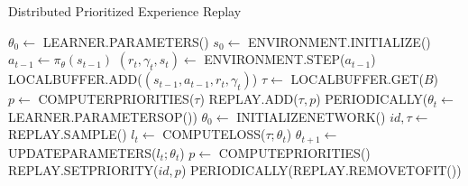 \documentclass[12pt,a4paper]{article}
\begin{document}
\begin{algorithm}
\caption{Distributed Prioritized Experience Replay}
\begin{algorithmic}

	\State $\theta_{0} \leftarrow$ LEARNER.PARAMETERS() %
	\State $s_0 \leftarrow$ ENVIRONMENT.INITIALIZE()  %
		\State $a_{t-1} \leftarrow \pi_{\theta}(s_{t-1})$ %
		\State $(r_t, \gamma_t, s_{t}) \leftarrow $ ENVIRONMENT.STEP($a_{t-1}$) %
		\State LOCALBUFFER.ADD($(s_{t-1}, a_{t-1}, r_t, \gamma_t)$) %
			\State $\tau \leftarrow$ LOCALBUFFER.GET($B$) %
			\State $p \leftarrow$ COMPUTERPRIORITIES($\tau$) %
			\State REPLAY.ADD($\tau, p$) %
		\EndIf
		\State PERIODICALLY($\theta_{t} \leftarrow$ LEARNER.PARAMETERSOP()) %
	\EndFor
\EndProcedure
\State
{}
	\State $\theta_{0} \leftarrow$ INITIALIZENETWORK() %
		\State $id, \tau \leftarrow $ REPLAY.SAMPLE() %
		\State $l_{t} \leftarrow $ COMPUTELOSS($\tau; \theta_{t}$) %
		\State $\theta_{t+1} \leftarrow$ UPDATEPARAMETERS($l_{t};\theta_{t}$)
		\State $p \leftarrow$ COMPUTEPRIORITIES() %
		\State REPLAY.SETPRIORITY($id, p$) %
		\State PERIODICALLY(REPLAY.REMOVETOFIT()) %
	\EndFor
\EndProcedure
\end{algorithmic}
\end{algorithm}



\end{document}
